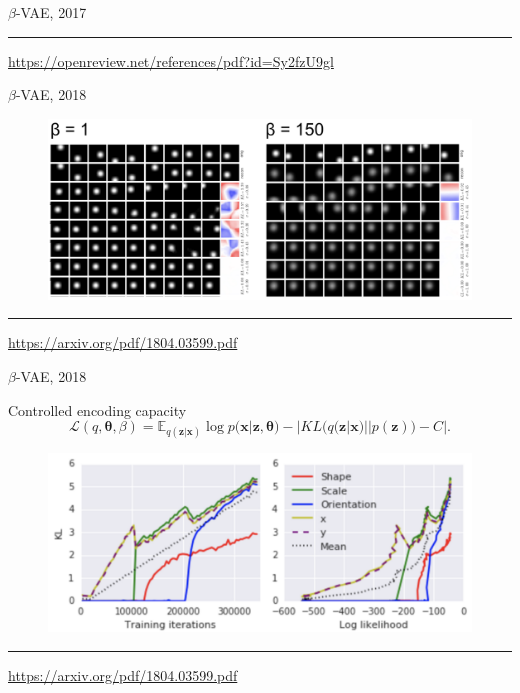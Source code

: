 \documentclass{beamer}
\newcommand{\bx}{\mathbf{x}}
\newcommand{\bz}{\mathbf{z}}
\newcommand{\btheta}{\boldsymbol{\theta}}
\begin{document}
\begin{frame}{$\beta$-VAE, 2017}
\begin{minipage}[t]{0.5\columnwidth}
\begin{figure}[h]
		\end{figure}
	\end{minipage}
\vfill
\hrule\medskip
{\scriptsize \href{https://openreview.net/references/pdf?id=Sy2fzU9gl}{https://openreview.net/references/pdf?id=Sy2fzU9gl}}
\end{frame}
\begin{frame}{$\beta$-VAE, 2018}
\begin{figure}
    \centering
    \includegraphics[width=\linewidth]{figs/betaVAE_6.png}
\end{figure}
\vfill
\hrule\medskip
{\scriptsize \href{https://arxiv.org/pdf/1804.03599.pdf}{https://arxiv.org/pdf/1804.03599.pdf}}
\end{frame}
\begin{frame}{$\beta$-VAE, 2018}
\begin{block}{Controlled encoding capacity}
\vspace{-0.5cm}
\[
    \mathcal{L}(q, \btheta, \beta) = \mathbb{E}_{q(\bz | \bx)} \log p(\bx | \bz, \btheta) - | KL (q(\bz | \bx) || p(\bz)) - C|.
\]
\end{block}
\begin{figure}
    \centering
    \includegraphics[width=\linewidth]{figs/betaVAE_7.png}
\end{figure}
\vfill
\hrule\medskip
{\scriptsize \href{https://arxiv.org/pdf/1804.03599.pdf}{https://arxiv.org/pdf/1804.03599.pdf}}
\end{frame}
\end{document}
